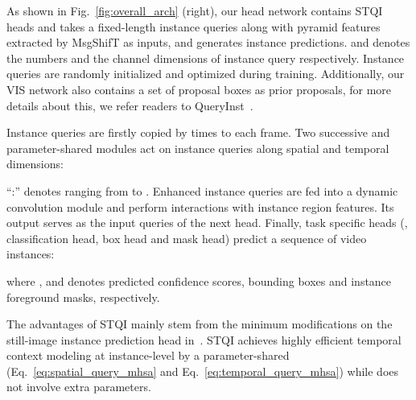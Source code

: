 \documentclass[10pt,twocolumn,letterpaper]{article}
\begin{document}
As shown in Fig.~\ref{fig:overall_arch} (right), our head network contains  STQI heads and takes a fixed-length instance queries  along with pyramid features extracted by MsgShifT  as inputs, and generates  instance predictions.  and  denotes the numbers and the channel dimensions of instance query respectively.
Instance queries  are randomly initialized and optimized during training. Additionally, our VIS network also contains a set of proposal boxes  as prior proposals, for more details about this, we refer readers to QueryInst~\cite{queryinst}.

Instance queries are firstly copied by  times to each frame. Two successive and parameter-shared  modules act on instance queries along spatial and temporal dimensions:



``:'' denotes ranging from  to . Enhanced instance queries  are fed into a dynamic convolution module and perform interactions with instance region features. Its output serves as the input queries of the next head.
Finally, task specific heads (\ie, classification head, box head and mask head) predict a sequence of video instances:

where ,  and  denotes predicted confidence scores, bounding boxes and instance foreground masks, respectively.

The advantages of STQI mainly stem from the minimum modifications on the still-image instance prediction head in~\cite{queryinst}. STQI achieves highly efficient temporal context modeling at instance-level by a parameter-shared  (Eq.~\ref{eq:spatial_query_mhsa} and Eq.~\ref{eq:temporal_query_mhsa}) while does not involve extra parameters.
\end{document}
